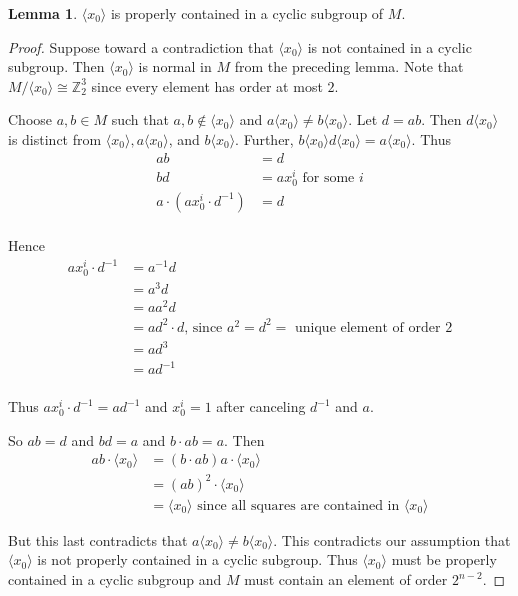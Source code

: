 \documentclass[12pt, twoside, openright]{report}
\theoremstyle{definition}
\newtheorem{lem}[thm]{Lemma}
\begin{document}
\begin{lem}
	$\langle x_0 \rangle$ is properly contained in a cyclic subgroup of $M$.
\end{lem}

\begin{proof}
	Suppose toward a contradiction that $\langle x_0\rangle$ is not contained in a cyclic subgroup.
    Then $\langle x_0\rangle$ is normal in $M$ from the preceding lemma. Note that
    $M/\langle x_0\rangle\cong \mathbb{Z}_2^3$ since every element has order at most $2$.

	Choose $a, b\in M$ such that $a, b\notin\langle x_0\rangle$ and $a\langle x_0\rangle \neq b\langle x_0\rangle$.
    Let $d = ab$. Then $d\langle x_0\rangle$ is distinct from $\langle x_0\rangle, a\langle x_0\rangle$,
    and $b\langle x_0\rangle$. Further, $b\langle x_0\rangle d\langle x_0\rangle = a\langle x_0\rangle$.
    Thus
	\begin{align*}
	ab &= d\\
    bd &= ax_0^i\text{ for some $i$}\\
    a\cdot (ax_0^i \cdot d^{-1}) &= d\\
    \end{align*}

    Hence
    \begin{align*}
    ax_0^i \cdot d^{-1} &= a^{-1}d\\
    &= a^3 d\\
    &= aa^2 d\\
    &= ad^2\cdot d\text{, since $a^2 = d^2 =$ unique element of order 2}\\
    &= ad^3\\
    &= ad^{-1}\\
    \end{align*}

    Thus $ax_0^i \cdot d^{-1} = ad^{-1}$ and $x_0^i = 1$ after canceling $d^{-1}$ and $a$.

	So $ab = d$ and $bd = a$ and $b\cdot ab = a$. Then
	\begin{align*}
	ab\cdot \langle x_0\rangle &= (b\cdot ab)a\cdot \langle x_0\rangle\\
	&= (ab)^2\cdot \langle x_0\rangle\\
	&= \langle x_0\rangle\text{ since all squares are contained in $\langle x_0\rangle$}
	\end{align*}

	But this last contradicts that $a\langle x_0\rangle \neq b\langle x_0\rangle$. This contradicts our
    assumption that $\langle x_0\rangle$ is not properly contained in a cyclic subgroup. Thus
    $\langle x_0\rangle$ must be properly contained in a cyclic subgroup and $M$ must contain an
    element of order $2^{n - 2}$.
\end{proof}
\end{document}
